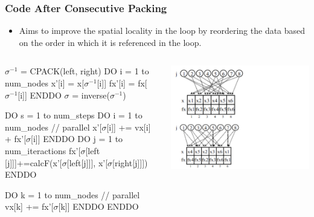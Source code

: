\documentclass{beamer}
\newcommand{\emphh}[1]{\textcolor{CosGreen}{ #1}}
\newcommand{\mymath}[1]{$ #1 $}
\newcommand{\myindx}[1]{_{#1}}
\newcommand{\myindu}[1]{^{#1}}
\begin{document}
\begin{frame}[fragile,t]
  \frametitle{Code After Consecutive Packing}

\begin{itemize}
    \item Aims to improve the \emphh{spatial locality} in the loop
            by reordering the data based on the order in which it is
            referenced in the loop.
\end  {itemize}


\begin{columns}
\begin{colorcode}
\mymath{\sigma\myindu{-1}} = CPACK(left, right)
DO i = 1 to num_nodes
   x'[i] =  x[\mymath{\sigma\myindu{-1}}[i]]
  fx'[i] = fx[\mymath{\sigma\myindu{-1}}[i]]
ENDDO
\mymath{\sigma} = inverse(\mymath{\sigma\myindu{-1}})

DO s = 1 to num_steps
  DO i = 1 to num_nodes  // parallel
    \alert{x'[\mymath{\sigma}[i]]} += \emphh{vx[i]} + \alert{fx'[\mymath{\sigma}[i]]}
  ENDDO
  DO j = 1 to num_iteractions
    \emphh{fx'[\mymath{\sigma}[left [j]]]+=calcF(x'[\mymath{\sigma}[left[j]]],}
                            \emphh{x'[\mymath{\sigma}[right[j]]])}
  ENDDO

  DO k = 1 to num_nodes // parallel
    \emphh{vx[k]} += \alert{fx'[\mymath{\sigma}[k]]}
  ENDDO
ENDDO
\end{colorcode}
\includegraphics[width=53ex]{Figures/DataReordering1}
\end{columns}
\end{frame}
\end{document}
